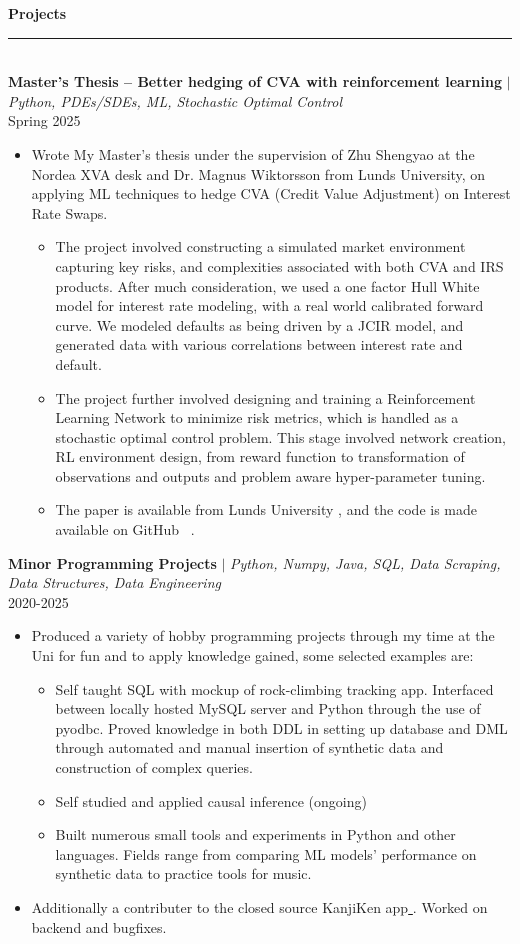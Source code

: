 \documentclass[10pt, a4paper, english]{article}
\newcommand{\smallgit}[1]{~\href{#1}{\faGithub} }
\def\MastersTitle{Master's Thesis -- Better hedging of CVA with reinforcement learning}%
\newcommand{\mysection}[1]{\color{black}\textbf{\LARGE{#1}}\\
				        \rule[1em]{\widthof{\textbf{\LARGE{#1}}}}{1.333pt} \color{darkgray!80!black}\\ \vspace{-1em}}
\newcommand{\PExperience}[3]{\normalsize \noindent \textbf{#1} $\vert$ \textit{\footnotesize#3} \hfil \\ #2 \vspace{-0.25em}}
\begin{document}
\newpage
{}
\raggedright
\mysection{Projects}
\PExperience{\MastersTitle}{Spring 2025}{Python, PDEs/SDEs, ML, Stochastic Optimal Control}
\begin{itemize}
\item Wrote My Master's thesis under the supervision of Zhu Shengyao at the Nordea XVA desk and Dr. Magnus Wiktorsson from Lunds University, on applying ML techniques to hedge CVA (Credit Value Adjustment) on Interest Rate Swaps.
	\begin{itemize} 
		\item The project involved constructing a simulated market environment capturing key risks, and complexities associated with both CVA and IRS products. After much consideration, we used a one factor Hull White model for interest rate 		modeling, with a real world calibrated forward curve. We modeled defaults as being driven by a JCIR model, and generated data with various correlations between interest rate and default.
		\item The project further involved designing and training a Reinforcement Learning Network to minimize risk metrics, which is handled as a stochastic optimal control problem. This stage involved network creation, RL environment design, from reward function to transformation of observations and outputs and problem aware hyper-parameter tuning.
		\item The paper is available from Lunds University \href{http://lup.lub.lu.se/student-papers/record/9197473}{ \scriptsize \faLink}, and the code is made available on GitHub\smallgit{https://github.com/Squid-oid/cva_risk_management_thesis}.
	\end{itemize}
\end{itemize}

\PExperience{Minor Programming Projects}{2020-2025}{Python, Numpy, Java, SQL, Data Scraping, Data Structures, Data Engineering}
\begin{itemize}
\item Produced a variety of hobby programming projects through my time at the Uni for fun and to apply knowledge gained, some selected examples are:
	\begin{itemize}\normalsize 
		\item Self taught SQL with mockup of rock-climbing tracking app. Interfaced between locally hosted MySQL server and Python through the use of pyodbc. Proved knowledge in both DDL in setting up database and DML through automated and manual insertion of synthetic data and construction of complex queries. \smallgit{https://github.com/Squid-oid/SQL}
		\item Self studied and applied causal inference (ongoing)\smallgit{https://github.com/Squid-oid/causal}
		\item Built numerous small tools and experiments in Python and other languages. Fields range from comparing ML models' performance on synthetic data to practice tools for music.
	\end{itemize}
\item Additionally a contributer to the closed source KanjiKen app\href{https://kanjiken.com/}{ \scriptsize \faLink}. Worked on backend and bugfixes. 
\end{itemize}
\end{document}
